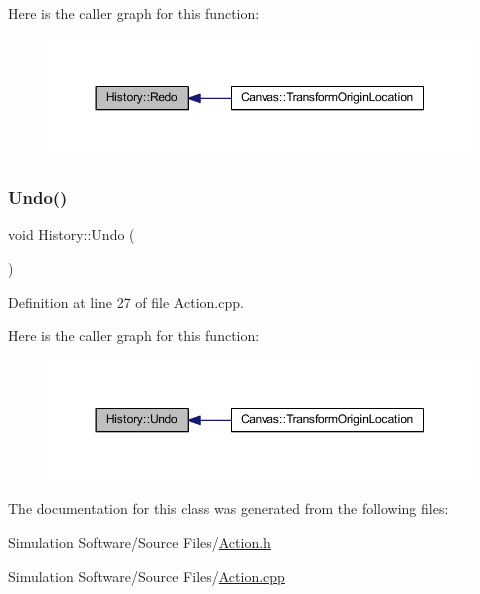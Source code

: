 Here is the caller graph for this function\+:
\nopagebreak
\begin{figure}[H]
\begin{center}
\leavevmode
\includegraphics[width=350pt]{class_history_abc639588fdca61df2902377e08a64dd6_icgraph}
\end{center}
\end{figure}
\mbox{\label{class_history_a4cf63a4e996f75e5c3b99b42fe56c6d3}} 
\subsubsection{\texorpdfstring{Undo()}{Undo()}}
{\footnotesize\ttfamily void History\+::\+Undo (\begin{DoxyParamCaption}{ }\end{DoxyParamCaption})}



Definition at line 27 of file Action.\+cpp.

Here is the caller graph for this function\+:
\nopagebreak
\begin{figure}[H]
\begin{center}
\leavevmode
\includegraphics[width=350pt]{class_history_a4cf63a4e996f75e5c3b99b42fe56c6d3_icgraph}
\end{center}
\end{figure}


The documentation for this class was generated from the following files\+:\begin{DoxyCompactItemize}
\item 
Simulation Software/\+Source Files/\hyperlink{_action_8h}{Action.\+h}\item 
Simulation Software/\+Source Files/\hyperlink{_action_8cpp}{Action.\+cpp}\end{DoxyCompactItemize}
